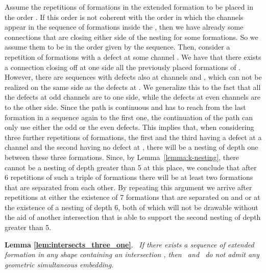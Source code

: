 \documentclass[a4paper,10pt]{llncs}
\renewenvironment{proof}
{{\bf Proof:}}{\hspace*{\fill}\par\vspace{2mm}}
\newcommand{\rephrase}[3]{\noindent\textbf{#1 #2}.~\emph{#3}}
\newcommand{\T}{\mbox{ }}
\renewcommand{\P}{\mbox{ }}
\begin{document}
\begin{proof}
Assume the repetitions of formations in the extended formation to be placed in the order .
If this order is not coherent with the order in which the channels appear in the sequence of formations inside the , then we have already some connections that are closing either side of the nesting for some formations. So we assume them to be in the order given by the sequence. Then, consider a repetition of formations with a defect at some channel . We have that there exists a connection closing off at one side all the previously placed formations of . However, there are sequences with defects also at channels  and , which can not be realized on the same side as the defects at . We generalize this to the fact that all the defects at odd channels are to one side, while the defects at even channels are to the other side.
Since the path is continuous and has to reach from the last formation in a sequence again to the first one, the continuation of the path can only use either the odd or the even defects. This implies that, when considering three further repetitions of formations, the first and the third having a defect at a channel  and the second having no defect at , there will be a nesting of depth one between these three formations. Since, by Lemma~\ref{lemma:k-nesting}, there cannot be a nesting of depth greater than 5 at this place, we conclude that after 6 repetitions of such a triple of formations there will be at least two formations that are separated from each other. By repeating this argument we arrive after  repetitions at either the existence of 7 formations that are separated on  and  or at the existence of a nesting of depth 6, both of which will not be drawable without the aid of another intersection that is able to support the second nesting of depth greater than 5.
\end{proof}

\rephrase{Lemma}{\ref{lem:intersects_three_one}}{
If there exists a sequence of extended formation in any shape containing an intersection , then \T and \P do not admit any geometric simultaneous embedding.
}
\end{document}
